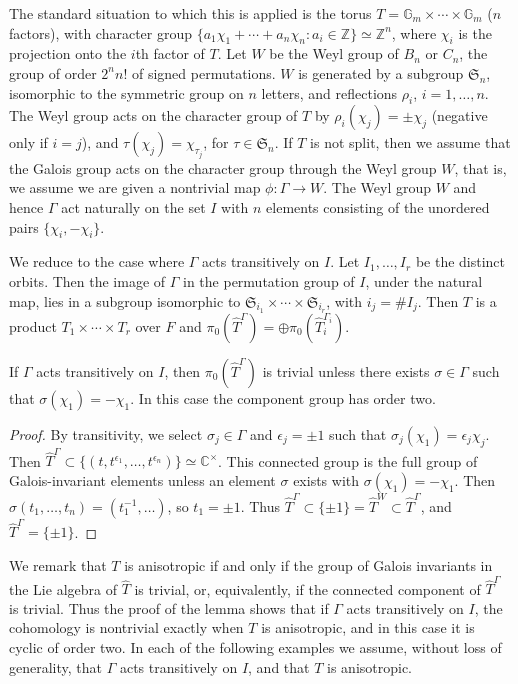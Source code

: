 \documentclass{amsart}
\newcommand\fS{{\mathfrak S}}
\newcommand\G{{\mathbb G}}
\newcommand\C{{\mathbb C}}
\newcommand\Z{{\mathbb Z}}
\newenvironment{cthm}[1]
  {\renewcommand\thethm{\bf #1}\thm}
  {\endthm}
\begin{document}
The standard situation to which this is applied is the
torus $T = \G_m\times\cdots\times \G_m$ ($n$ factors), with
character group $\{a_1\chi_1+\cdots+ a_n\chi_n: a_i\in \Z\}
\simeq\Z^n$, where $\chi_i$ is the projection onto the $i$th
factor of $T$.  Let $W$ be the Weyl group of $B_n$ or $C_n$,
the group of order $2^n n!$ of signed permutations.  $W$ is
generated by a subgroup $\fS_n$, isomorphic to the symmetric group
on $n$ letters, and reflections $\rho_i$, $i=1,\ldots,n$.  The
Weyl group acts on the character group of $T$ by $\rho_i(\chi_j) = \pm \chi_j$
(negative only if $i=j$), and $\tau(\chi_j) = \chi_{\tau_j}$,
for $\tau\in \fS_n$.   If $T$ is not split, then
we assume that the Galois group acts on the character group
through the Weyl group $W$, that is, we assume we are given
a nontrivial map $\phi:\Gamma\to W$.
The Weyl group $W$ and
hence $\Gamma$ act naturally on the set $I$ with $n$ elements
consisting of the unordered pairs $\{\chi_i,-\chi_i\}$.  

We reduce to the case where $\Gamma$ acts transitively on $I$.
Let
$I_1,\ldots, I_r$ be the distinct orbits.  Then the
image of $\Gamma$ in the permutation group of $I$,
under the natural map,
lies in a subgroup isomorphic to $\fS_{i_1}\times\cdots\times 
\fS_{i_r}$,  with $i_j= \# I_j$.
Then $T$ is a product $T_1\times\cdots\times T_r$ over $F$ and 
$\pi_0(\hat T^\Gamma) = \oplus \pi_0(\hat T_i^{\Gamma_i})$.

\bigskip
\noindent
\begin{cthm}{Lemma 4.1}   If $\Gamma$ acts transitively on $I$, then
$\pi_0(\hat T^\Gamma)$ is trivial unless there exists
$\sigma\in \Gamma$ such that $\sigma(\chi_1) =-\chi_1$.  In
this case the component group has order two.
\end{cthm}

\bigskip
\noindent
\begin{proof}    By transitivity, we select $\sigma_j\in \Gamma$
and $\epsilon_j=\pm 1$ such that $\sigma_j(\chi_1)=\epsilon_j\chi_j$.
Then $\hat T^\Gamma \subset \{(t,t^{\epsilon_1},\ldots,t^{\epsilon_n})\}
\simeq \C^\times$.   This connected group is the full group
of Galois-invariant elements unless an element $\sigma$ exists
with $\sigma(\chi_1)=-\chi_1$.  Then $\sigma(t_1,\ldots,t_n) =
(t_1^{-1},\ldots)$, so $t_1 = {\pm 1}$.  
Thus $\hat T^\Gamma\subset \{\pm1\} = \hat T^W \subset
\hat T^\Gamma$, and $\hat T^\Gamma =\{\pm1\}$.\end{proof}

\smallskip
We remark that $T$ is anisotropic if and only if the group
of Galois invariants in the Lie algebra of $\hat T$ is trivial,
or, equivalently, if the connected component of $\hat T^\Gamma$
is trivial.  Thus the proof of the lemma shows 
that if $\Gamma$ acts transitively
on $I$, the cohomology is nontrivial exactly when $T$ is
anisotropic, and in this case it is cyclic of order two.
In each of the following examples we assume, without
loss of generality, that $\Gamma$ acts transitively on $I$,
and that $T$ is anisotropic.
\end{document}
